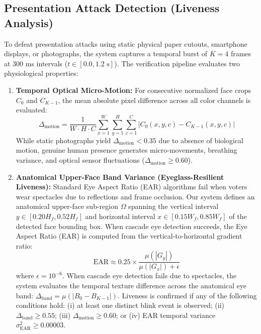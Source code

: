 \documentclass[conference]{IEEEtran}
\begin{document}
\subsection{Presentation Attack Detection (Liveness Analysis)}
To defeat presentation attacks using static physical paper cutouts, smartphone displays, or photographs, the system captures a temporal burst of $K=4$ frames at 300 ms intervals ($t \in [0.0, 1.2\text{ s}]$). The verification pipeline evaluates two physiological properties:
\begin{enumerate}
    \item \textbf{Temporal Optical Micro-Motion:} For consecutive normalized face crops $C_0$ and $C_{K-1}$, the mean absolute pixel difference across all color channels is evaluated:
    \begin{equation}
        \Delta_{\text{motion}} = \frac{1}{W \cdot H \cdot C} \sum_{x=1}^{W}\sum_{y=1}^{H}\sum_{c=1}^{C} |C_0(x, y, c) - C_{K-1}(x, y, c)|
    \end{equation}
    While static photographs yield $\Delta_{\text{motion}} < 0.35$ due to absence of biological motion, genuine human presence generates micro-movements, breathing variance, and optical sensor fluctuations ($\Delta_{\text{motion}} \ge 0.60$).
    \item \textbf{Anatomical Upper-Face Band Variance (Eyeglass-Resilient Liveness):} Standard Eye Aspect Ratio (EAR) algorithms fail when voters wear spectacles due to reflections and frame occlusion. Our system defines an anatomical upper-face sub-region $\Omega$ spanning the vertical interval $y \in [0.20 H_f, 0.52 H_f]$ and horizontal interval $x \in [0.15 W_f, 0.85 W_f]$ of the detected face bounding box. When cascade eye detection succeeds, the Eye Aspect Ratio (EAR) is computed from the vertical-to-horizontal gradient ratio:
    \begin{equation}
        \text{EAR} \approx 0.25 \times \frac{\mu\left(|G_y|\right)}{\mu\left(|G_x|\right) + \epsilon}
    \end{equation}
    where $\epsilon = 10^{-6}$. When cascade eye detection fails due to spectacles, the system evaluates the temporal texture difference across the anatomical eye band: $\Delta_{\text{band}} = \mu(|B_0 - B_{K-1}|)$. Liveness is confirmed if any of the following conditions hold: (i) at least one distinct blink event is observed; (ii) $\Delta_{\text{band}} \ge 0.55$; (iii) $\Delta_{\text{motion}} \ge 0.60$; or (iv) EAR temporal variance $\sigma^2_{\text{EAR}} \ge 0.00003$.
\end{enumerate}
\end{document}
